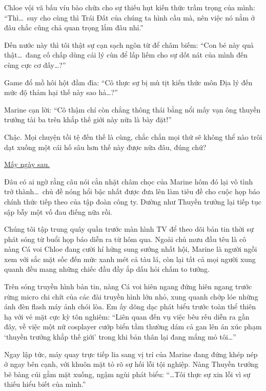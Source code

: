\documentclass[../main.tex]{subfiles}
\begin{document}
Chloe vội vã bấu víu bào chữa cho sự thiếu hụt kiến thức trầm trọng của mình: ``Thì\dots\ suy cho cùng thì Trái Đất của chúng ta hình cầu mà, nên việc nó nằm ở đâu chắc cũng chả quan trọng lắm đâu nhỉ.''

Đến nước này thì tôi thật sự cạn sạch ngôn từ để châm biếm: ``Con bé này quả thật\dots\ đang cố chấp dùng cái lý cùn để lấp liếm cho sự dốt nát của mình đến cùng cực cơ đấy\dots?''

Game đổ mồ hôi hột đầm đìa: ``Cô thực sự bị mù tịt kiến thức môn Địa lý đến mức độ thảm hại thế này sao hả\dots?''

Marine cạn lời: ``Cô thậm chí còn chẳng thông thái bằng nổi mấy vạn ông thuyền trưởng tài ba trên khắp thế giới này nữa là bày đặt!''

Chậc. Mọi chuyện tồi tệ đến thế là cùng, chắc chắn mọi thứ sẽ không thể nào trôi dạt xuống một cái hố sâu hơn thế này được nữa đâu, đúng chứ?

\begin{center}
    \uline{Mấy ngày sau.}
\end{center}

Đâu có ai ngờ rằng câu nói cằn nhặt châm chọc của Marine hôm đó lại vô tình trở thành\dots\ chủ đề nóng hổi bậc nhất được đưa lên làm tiêu đề cho cuộc họp báo chính thức tiếp theo của tập đoàn công ty. Dường như Thuyền trưởng lại tiếp tục sập bẫy một vố đau điếng nữa rồi.

Chúng tôi tập trung quây quần trước màn hình TV để theo dõi bản tin thời sự phát sóng từ buổi họp báo diễn ra từ hôm qua. Ngoài chủ mưu đầu têu là cô nàng Cá voi Chloe đang cười hí hửng sung sướng nhất hội, Marine là người ngồi xem với sắc mặt sốc đến mức xanh mét cả tàu lá, còn lại tất cả mọi người xung quanh đều mang những chiếc đầu đầy ắp dấu hỏi chấm to tướng.

Trên sóng truyền hình bản tin, nàng Cá voi hiên ngang đứng hiên ngang trước rừng micro chi chít của các đài truyền hình lớn nhỏ, xung quanh chớp lóe những ánh đèn flash máy ảnh chói lòa. Em ấy dõng dạc phát biểu trước toàn thể thiên hạ với vẻ mặt cực kỳ tôn nghiêm: ``Liên quan đến vụ việc bêu rếu diễn ra gần đây, về việc một nữ cosplayer cướp biển tầm thường dám cả gan lên án xúc phạm `thuyền trưởng khắp thế giới' trong khi bản thân lại đang mắng mỏ tôi\dots''


Ngay lập tức, máy quay trực tiếp lia sang vị trí của Marine đang đứng khép nép ở ngay bên cạnh, với khuôn mặt tỏ rõ sự hối lỗi tội nghiệp. Nàng Thuyền trưởng bẽ bàng cúi gằm mặt xuống, ngậm ngùi phát biểu: ``\dots Tôi thực sự xin lỗi vì sự thiếu hiểu biết của mình.''
\end{document}
